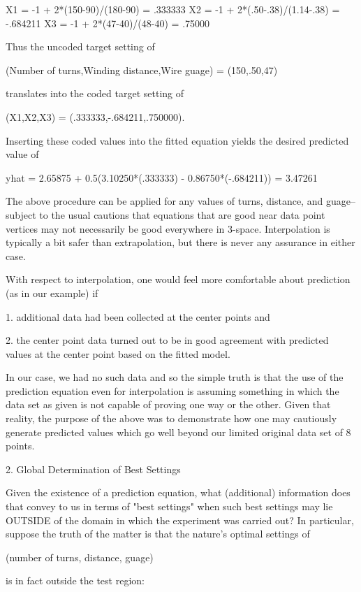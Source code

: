    X1 = -1 + 2*(150-90)/(180-90) = .333333
   X2 = -1 + 2*(.50-.38)/(1.14-.38) = -.684211
   X3 = -1 + 2*(47-40)/(48-40) = .75000

Thus the uncoded target setting of

   (Number of turns,Winding distance,Wire guage) = (150,.50,47)

translates into the coded target setting of

   (X1,X2,X3) = (.333333,-.684211,.750000).

Inserting these coded values into the fitted
equation yields the desired predicted value of

   yhat = 2.65875 + 0.5(3.10250*(.333333) - 0.86750*(-.684211))
        = 3.47261

The above procedure can be applied for any
values of turns, distance, and guage-- subject to
the usual cautions that equations that are good
near data point vertices may not necessarily be
good everywhere in 3-space.  Interpolation is
typically a bit safer than extrapolation, but there
is never any assurance in either case.

With respect to interpolation,
one would feel more comfortable about
prediction (as in our example) if

   1. additional data had been collected at the
      center points and

   2. the center point data turned out to be in
      good agreement with predicted values at the
      center point based on the fitted model.

In our case, we had no such data and so the
simple truth is that the use of the prediction
equation even for interpolation is assuming something in which the data
set as given is not capable of proving one way or
the other.  Given that reality, the purpose of the above was to
demonstrate how one may cautiously generate
predicted values which go well beyond our limited
original data set of 8 points.

2. Global Determination of Best Settings

Given the existence of a prediction equation, what
(additional) information does that convey to us in
terms of "best settings" when such best settings
may lie OUTSIDE of the domain in which the
experiment was carried out?  In particular,
suppose the truth of the matter is that the
nature's optimal settings of

   (number of turns, distance, guage)

is in fact outside the test region:

